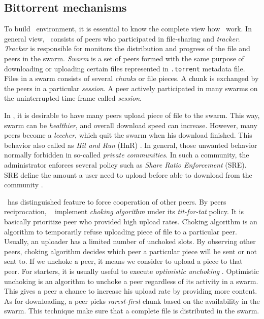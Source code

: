 \subsection{Bittorrent mechanisms}
To build \bt~environment, it is essential to know the complete view how \bt~work. In general view, \bt~consists of peers who participated in file-sharing and \textit{tracker}. \textit{Tracker} is responsible for monitors the distribution and progress of the file and peers in the swarm. \textit{Swarm} is a set of peers formed with the same purpose of downloading or uploading certain files represented in \texttt{.torrent} metadata file. Files in a swarm consists of several \textit{chunks} or file pieces. A chunk is exchanged by the peers in a particular \textit{session}. A peer actively participated in many swarms on the uninterrupted time-frame called \textit{session}. 

In \bt, it is desirable to have many peers upload piece of file to the swarm. This way, swarm can be \textit{healthier}, and overall download speed can increase. However, many peers become a \textit{leecher}, which quit the swarm when his download finished. This behavior also called as \textit{Hit and Run} (HnR) \cite{2014:sustainabilitytorrent:chen}. In general, those unwanted behavior normally forbidden in so-called \textit{private communities}. In such a community, the administrator enforces several policy such as \textit{Share Ratio Enforcement} (SRE). SRE define the amount a user need to upload before able to download from the community \cite{2012:economicbt:kash}.

\bt~has distinguished feature to force cooperation of other peers. By peers reciprocation, \bt~ implement \textit{choking algorithm} under its \textit{tit-for-tat} policy. It is basically prioritize peer who provided high upload rates. Choking algorithm is an algorithm to temporarily refuse uploading piece of file to a particular peer. Usually, an uploader has a limited number of unchoked slots. By observing other peers, choking algorithm decides which peer a particular piece will be sent or not sent to. If we unchoke a peer, it means we consider to upload a piece to that peer. For starters, it is usually useful to execute \textit{optimistic unchoking} \cite{2003:bittorrent:cohen}. Optimistic unchoking is an algorithm to unchoke a peer regardless of its activity in a swarm. This gives a peer a chance to increase his upload rate by providing more content. As for downloading, a peer picks \textit{rarest-first} chunk based on the availability in the swarm. This technique make sure that a complete file is distributed in the swarm.

